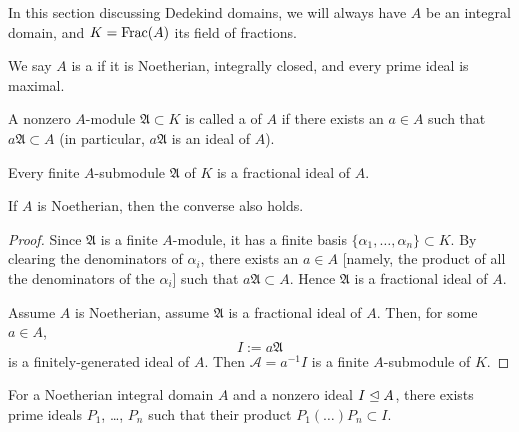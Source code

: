 \begin{convention}
In this section discussing Dedekind domains, we will always have $A$
be an integral domain, and $K=\operatorname{Frac}(A)$ its field of fractions.
\end{convention}

\begin{definition}
We say $A$ is a  if it is Noetherian,
integrally closed, and every prime ideal is maximal.
\end{definition}

\begin{definition}
A nonzero $A$-module $\mathfrak{A}\subset K$ is called a
 of $A$ if there exists an $a\in A$ such that
$a\mathfrak{A}\subset A$ (in particular, $a\mathfrak{A}$ is an ideal
of $A$).
\end{definition}

\begin{lemma}\label{lemma:18.1}
Every finite $A$-submodule $\mathfrak{A}$ of $K$ is a fractional ideal
of $A$.

If $A$ is Noetherian, then the converse also holds.
\end{lemma}

\begin{proof}
Since $\mathfrak{A}$ is a finite $A$-module, it has a finite basis
$\{\alpha_{1},\dots,\alpha_{n}\}\subset K$. By clearing the
denominators of $\alpha_{i}$, there exists an $a\in A$ [namely, the
  product of all the denominators of the $\alpha_{i}$] such that
$a\mathfrak{A}\subset A$. Hence $\mathfrak{A}$ is a fractional ideal
of $A$.

Assume $A$ is Noetherian, assume $\mathfrak{A}$ is a fractional ideal
of $A$. Then, for some $a\in A$,
\begin{equation}
I:=a\mathfrak{A}
\end{equation}
is a finitely-generated ideal of $A$. Then $\mathcal{A}=a^{-1}I$ is a
finite $A$-submodule of $K$.
\end{proof}

\begin{lemma}\label{lemma:18.2}
For a Noetherian integral domain $A$ and a nonzero ideal $I\mathrel{\trianglelefteq} A$,
there exists prime ideals $P_{1}$, \dots, $P_{n}$ such that their
product $P_{1}(\dots)P_{n}\subset I$.
\end{lemma}

